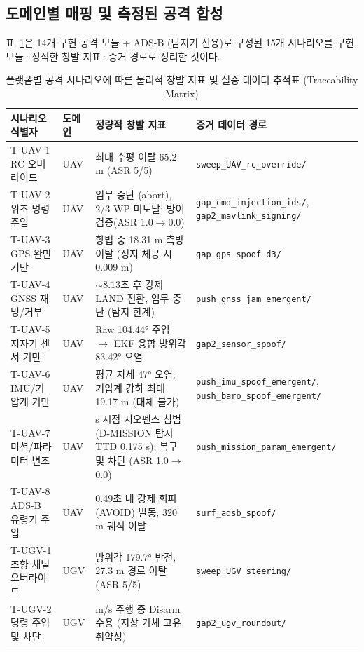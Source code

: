 \subsection{도메인별 매핑 및 측정된 공격 합성}

표~\ref{tab:scenario_mapping}은 14개 구현 공격 모듈 + ADS-B (탐지기 전용)로 구성된 15개 시나리오를 구현 모듈·정직한 창발 지표·증거 경로로 정리한 것이다.

\begin{table}[H]
\centering
\caption{플랫폼별 공격 시나리오에 따른 물리적 창발 지표 및 실증 데이터 추적표 (Traceability Matrix)}
\label{tab:scenario_mapping}
\renewcommand{\arraystretch}{1.3}
\small
\begin{tabularx}{\textwidth}{@{} l l >{\raggedright\arraybackslash}X >{\raggedright\arraybackslash}X @{}}
\toprule
\textbf{시나리오 식별자} & \textbf{도메인} & \textbf{정량적 창발 지표} & \textbf{증거 데이터 경로} \\
\midrule
T-UAV-1 RC 오버라이드 & UAV & 최대 수평 이탈 65.2 m (ASR 5/5) & \texttt{sweep\_UAV\_rc\_override/} \\
T-UAV-2 위조 명령 주입 & UAV & 임무 중단 (abort), 2/3 WP 미도달; 방어 검증(ASR 1.0$\to$0.0) & \texttt{gap\_cmd\_injection\_ids/}, \texttt{gap2\_mavlink\_signing/} \\
T-UAV-3 GPS 완만 기만 & UAV & 항법 중 18.31 m 측방 이탈 (정지 체공 시 0.009 m) & \texttt{gap\_gps\_spoof\_d3/} \\
T-UAV-4 GNSS 재밍/거부 & UAV & $\sim$8.13초 후 강제 LAND 전환, 임무 중단 (탐지 한계) & \texttt{push\_gnss\_jam\_emergent/} \\
T-UAV-5 지자기 센서 기만 & UAV & Raw 104.44° 주입 $\to$ EKF 융합 방위각 83.42° 오염 & \texttt{gap2\_sensor\_spoof/} \\
T-UAV-6 IMU/기압계 기만 & UAV & 평균 자세 47° 오염; 기압계 강하 최대 19.17 m (대체 불가) & \texttt{push\_imu\_spoof\_emergent/}, \texttt{push\_baro\_spoof\_emergent/} \\
T-UAV-7 미션/파라미터 변조 & UAV & 88.6 s 시점 지오펜스 침범 (D-MISSION 탐지 TTD 0.175 s); 복구 및 차단 (ASR 1.0$\to$0.0) & \texttt{push\_mission\_param\_emergent/} \\
T-UAV-8 ADS-B 유령기 주입 & UAV & 0.49초 내 강제 회피 (AVOID) 발동, 320 m 궤적 이탈 & \texttt{surf\_adsb\_spoof/} \\
T-UGV-1 조향 채널 오버라이드 & UGV & 방위각 179.7° 반전, 27.3 m 경로 이탈 (ASR 5/5) & \texttt{sweep\_UGV\_steering/} \\
T-UGV-2 명령 주입 및 차단 & UGV & 1.05 m/s 주행 중 Disarm 수용 (지상 기체 고유 취약성) & \texttt{gap2\_ugv\_roundout/} \\

\end{tabularx}
\end{table}
